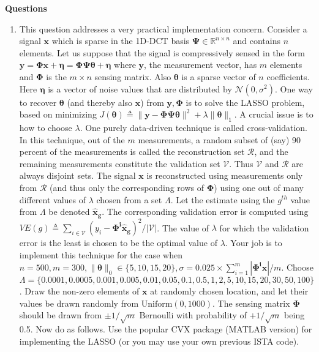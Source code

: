 \documentclass[11pt]{article}
\begin{document}
\newpage
\noindent\textbf{Questions}
\begin{enumerate}
\item This question addresses a very practical implementation concern. Consider a signal $\boldsymbol{x}$ which is sparse in the 1D-DCT basis $\boldsymbol{\Psi} \in \mathbb{R}^{n \times n}$ and contains $n$ elements. Let us suppose that the signal is compressively sensed in the form $\boldsymbol{y} = \boldsymbol{\Phi x} + \boldsymbol{\eta} = \boldsymbol{\Phi \Psi \theta} + \boldsymbol{\eta}$ where $\boldsymbol{y}$, the measurement vector, has $m$ elements and $\boldsymbol{\Phi}$ is the $m \times n$ sensing matrix. Also $\boldsymbol{\theta}$ is a sparse vector of $n$ coefficients. Here $\boldsymbol{\eta}$ is a vector of noise values that are distributed by $\mathcal{N}(0,\sigma^2)$.  One way to recover $\boldsymbol{\theta}$ (and thereby also $\boldsymbol{x}$) from $\boldsymbol{y}, \boldsymbol{\Phi}$ is to solve the LASSO problem, based on minimizing $J(\boldsymbol{\theta}) \triangleq \|\boldsymbol{y}-\boldsymbol{\Phi \Psi \theta}\|^2 + \lambda \|\boldsymbol{\theta}\|_1$. A crucial issue is to how to choose $\lambda$. One purely data-driven technique is called cross-validation. In this technique, out of the $m$ measurements, a random subset of (say) 90 percent of the measurements is called the reconstruction set $\mathcal{R}$, and the remaining measurements constitute the validation set $\mathcal{V}$. Thus $\mathcal{V}$ and $\mathcal{R}$ are always disjoint sets. The signal $\boldsymbol{x}$ is reconstructed using measurements only from $\mathcal{R}$ (and thus only the corresponding rows of $\boldsymbol{\Phi}$) using one out of many different values of $\lambda$ chosen from a set $\Lambda$. Let the estimate using the $g^{th}$ value from $\Lambda$ be denoted $\boldsymbol{\hat{x}_g}$. The corresponding validation error is computed using $VE(g) \triangleq \sum_{i \in \mathcal{V}} (y_i - \boldsymbol{\Phi^i \hat{x}_g})^2/|\mathcal{V}|$. The value of $\lambda$ for which the validation error is the least is chosen to be the optimal value of $\lambda$. Your job is to implement this technique for the case when $n = 500, m = 300, \|\boldsymbol{\theta}\|_0 \in \{5,10,15,20\}, \sigma = 0.025 \times \sum_{i=1}^m |\boldsymbol{\Phi^i x}| / m$. Choose $\Lambda = \{0.0001, 0.0005, 0.001, 0.005, 0.01, 0.05, 0.1, 0.5, 1, 2, 5, 10, 15, 20, 30, 50, 100\}$. Draw the non-zero elements of $\boldsymbol{x}$ at randomly chosen location, and let their values be drawn randomly from $\textrm{Uniform}(0,1000)$. The sensing matrix $\boldsymbol{\Phi}$ should be drawn from $\pm 1/\sqrt{m} \textrm{ Bernoulli}$ with probability of $+1/\sqrt{m}$ being 0.5. Now do as follows. Use the popular CVX package (MATLAB version)  for implementing the LASSO (or you may use your own previous ISTA code). 


\end{enumerate}
\end{document}

